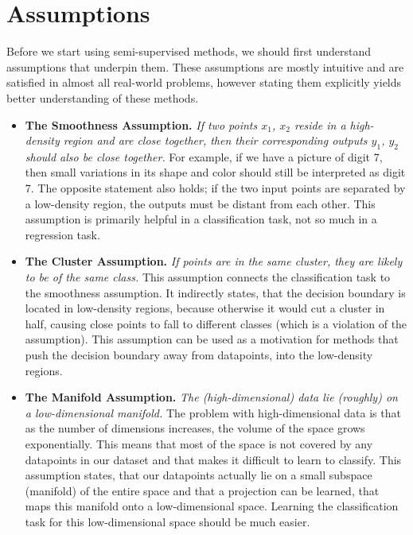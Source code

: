 \section{Assumptions}
\label{sec:SslAssumptions}

Before we start using semi-supervised methods, we should first understand assumptions that underpin them. These assumptions are mostly intuitive and are satisfied in almost all real-world problems, however stating them explicitly yields better understanding of these methods.

\begin{itemize}
    \item \textbf{The Smoothness Assumption.} \emph{If two points $x_1$, $x_2$ reside in a high-density region and are close together, then their corresponding outputs $y_1$, $y_2$ should also be close together.} For example, if we have a picture of digit 7, then small variations in its shape and color should still be interpreted as digit 7. The opposite statement also holds; if the two input points are separated by a low-density region, the outputs must be distant from each other. This assumption is primarily helpful in a classification task, not so much in a regression task.
    \item  \textbf{The Cluster Assumption.} \emph{If points are in the same cluster, they are likely to be of the same class.} This assumption connects the classification task to the smoothness assumption. It indirectly states, that the decision boundary is located in low-density regions, because otherwise it would cut a cluster in half, causing close points to fall to different classes (which is a violation of the assumption). This assumption can be used as a motivation for methods that push the decision boundary away from datapoints, into the low-density regions.
    \item \textbf{The Manifold Assumption.} \emph{The (high-dimensional) data lie (roughly) on a low-dimensional manifold.} The problem with high-dimensional data is that as the number of dimensions increases, the volume of the space grows exponentially. This means that most of the space is not covered by any datapoints in our dataset and that makes it difficult to learn to classify. This assumption states, that our datapoints actually lie on a small subspace (manifold) of the entire space and that a projection can be learned, that maps this manifold onto a low-dimensional space. Learning the classification task for this low-dimensional space should be much easier.
\end{itemize}


